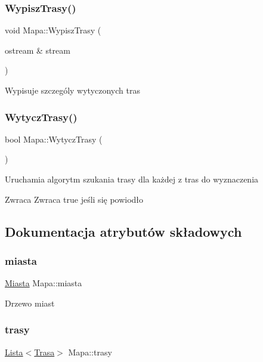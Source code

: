 \subsubsection{\texorpdfstring{Wypisz\+Trasy()}{WypiszTrasy()}}
{\footnotesize\ttfamily void Mapa\+::\+Wypisz\+Trasy (\begin{DoxyParamCaption}\item[{ostream \&}]{stream }\end{DoxyParamCaption})}

Wypisuje szczególy wytyczonych tras \mbox{\label{class_mapa_a01487ae9138832312922ea23577fcac4}} 
\subsubsection{\texorpdfstring{Wytycz\+Trasy()}{WytyczTrasy()}}
{\footnotesize\ttfamily bool Mapa\+::\+Wytycz\+Trasy (\begin{DoxyParamCaption}{ }\end{DoxyParamCaption})}

Uruchamia algorytm szukania trasy dla każdej z tras do wyznaczenia \begin{DoxyReturn}{Zwraca}
Zwraca true jeśli się powiodło 
\end{DoxyReturn}


\subsection{Dokumentacja atrybutów składowych}
\mbox{\label{class_mapa_a114a3a690e8eeea081e8ef25bb4561c9}} 
\subsubsection{\texorpdfstring{miasta}{miasta}}
{\footnotesize\ttfamily \mbox{\hyperlink{class_miasta}{Miasta}} Mapa\+::miasta}

Drzewo miast \mbox{\label{class_mapa_aad92737082c0fc9bdc3cd16177b08bd3}} 
\subsubsection{\texorpdfstring{trasy}{trasy}}
{\footnotesize\ttfamily \mbox{\hyperlink{class_lista}{Lista}}$<$\mbox{\hyperlink{struct_trasa}{Trasa}}$>$ Mapa\+::trasy}

